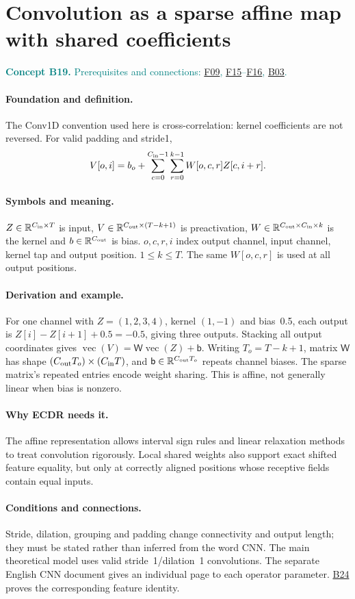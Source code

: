 \documentclass[11pt,a4paper]{article}
\newcommand{\R}{\mathbb R}
\newcommand{\conceptid}{Front matter}
\newcommand{\concept}[3]{\clearpage\renewcommand{\conceptid}{#1}%
\section{#2}\label{concept:#1}%
\textcolor{teal}{\textbf{Concept #1.} Prerequisites and connections: #3.}\par
\typeout{ECDR-CONCEPT-START #1 PAGE=\thepage}}
\begin{document}
\concept{B19}{Convolution as a sparse affine map with shared coefficients}{\hyperref[concept:F09]{F09}, \hyperref[concept:F15]{F15}--\hyperref[concept:F16]{F16}, \hyperref[concept:B03]{B03}}
\paragraph{Foundation and definition.}
The Conv1D convention used here is cross-correlation: kernel coefficients
are not reversed. For valid padding and stride1,
\[
 V[o,i]=b_o+\sum_{c=0}^{C_{\rm in}-1}\sum_{r=0}^{k-1}
 W[o,c,r]Z[c,i+r].
\]
\paragraph{Symbols and meaning.}
$Z\in\R^{C_{\rm in}\times T}$ is input, $V\in\R^{C_{\rm out}\times(T-k+1)}$
is preactivation, $W\in\R^{C_{\rm out}\times C_{\rm in}\times k}$ is
the kernel and $b\in\R^{C_{\rm out}}$ is bias. $o,c,r,i$ index output
channel, input channel, kernel tap and output position. $1\le k\le T$.
The same $W[o,c,r]$ is used at all output positions.
\paragraph{Derivation and example.}
For one channel with $Z=(1,2,3,4)$, kernel $(1,-1)$ and bias~0.5,
each output is $Z[i]-Z[i+1]+0.5=-0.5$, giving three outputs. Stacking
all output coordinates gives $\operatorname{vec}(V)=\mathsf W\operatorname{vec}(Z)+\mathsf b$.
Writing $T_o=T-k+1$, matrix $\mathsf W$ has shape
$(C_{\rm out}T_o)\times(C_{\rm in}T)$, and $\mathsf b\in\R^{C_{\rm out}T_o}$
repeats channel biases. The sparse matrix's repeated entries encode weight
sharing. This is affine, not generally linear when bias is nonzero.
\paragraph{Why ECDR needs it.}
The affine representation allows interval sign rules and linear
relaxation methods to treat convolution rigorously. Local shared weights
also support exact shifted feature equality, but only at correctly aligned
positions whose receptive fields contain equal inputs.
\paragraph{Conditions and connections.}
Stride, dilation, grouping and padding change connectivity and output
length; they must be stated rather than inferred from the word CNN.
The main theoretical model uses valid stride~1/dilation~1 convolutions.
The separate English CNN document gives an individual page to each
operator parameter. \hyperref[concept:B24]{B24} proves the corresponding feature identity.
\par\label{endconcept:B19}
\end{document}
